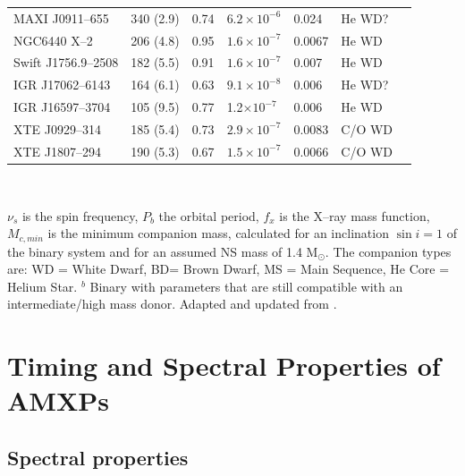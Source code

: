 \documentclass[graybox]{svmult}
\begin{document}
\begin{table}
\begin{center}
\begin{tabular}{lllllll}
MAXI J0911--655 & 340 (2.9) & 0.74 & $6.2\times 10^{-6}$ & 0.024  & He WD? &   \cite{Sanna2017a}\\
NGC6440 X--2 & 206 (4.8) & 0.95 & $1.6\times 10^{-7}$ & 0.0067 & He WD & \cite{Altamirano2010}\\
Swift J1756.9--2508  & 182  (5.5) &  0.91 &  $1.6\times 10^{-7}$ & 0.007  & He WD &  \cite{Krimm2007}\\
IGR J17062--6143  & 164  (6.1) &  0.63 &  $9.1\times 10^{-8}$ & 0.006  & He WD? &  \cite{Strohmayer2017}\\
IGR J16597--3704 & 105 (9.5) & 0.77 & 1.2$\times 10^{-7}$ & 0.006 & He WD & \cite{Sanna2018a}\\
\hline
XTE J0929--314  & 185  (5.4) & 0.73 & $2.9\times 10^{-7}$ & 0.0083  & C/O WD  & \cite{Galloway2002,Giles2005}\\
XTE J1807--294  & 190  (5.3) & 0.67 & $1.5\times 10^{-7}$ & 0.0066  & C/O WD  & \cite{Campana2003,DAvanzo2009} \\
\hline
\hline
\end{tabular}\\
\end{center}
$\nu_{s}$ is the spin frequency, $P_{b}$ the orbital period, $f_{x}$
is the X--ray mass function, $M_{c,min}$ is the minimum companion mass, calculated for an inclination $\sin i =1$ of the
binary system and for an assumed NS mass of 1.4 M$_\odot$. 
The companion types are: WD = White Dwarf, BD= Brown Dwarf, MS = Main Sequence, He Core = Helium Star.\newline
$^{b}$ Binary with parameters that are still compatible with an intermediate/high mass donor.\newline
Adapted and updated from \cite{Patruno2012a}.
\label{tab:lmxbs}
\end{table}






\section{Timing and Spectral Properties of AMXPs}

\subsection{Spectral properties}
\end{document}
